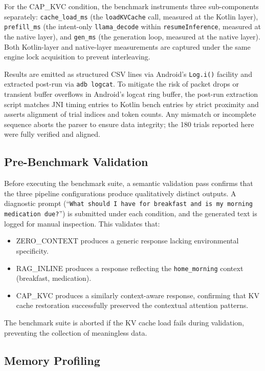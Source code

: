 \documentclass[journal]{IEEEtran}
\begin{document}
For the CAP\_KVC condition, the benchmark instruments three sub-components separately: \texttt{cache\_load\_ms} (the \texttt{loadKVCache} call, measured at the Kotlin layer), \texttt{prefill\_ms} (the intent-only \texttt{llama\_decode} within \texttt{resumeInference}, measured at the native layer), and \texttt{gen\_ms} (the generation loop, measured at the native layer). Both Kotlin-layer and native-layer measurements are captured under the same engine lock acquisition to prevent interleaving.

Results are emitted as structured CSV lines via Android's \texttt{Log.i()} facility and extracted post-run via \texttt{adb logcat}. To mitigate the risk of packet drops or transient buffer overflows in Android's logcat ring buffer, the post-run extraction script matches JNI timing entries to Kotlin bench entries by strict proximity and asserts alignment of trial indices and token counts. Any mismatch or incomplete sequence aborts the parser to ensure data integrity; the 180 trials reported here were fully verified and aligned.

\subsection{Pre-Benchmark Validation}
\label{sec:validation}

Before executing the benchmark suite, a semantic validation pass confirms that the three pipeline configurations produce qualitatively distinct outputs. A diagnostic prompt (``\texttt{What should I have for breakfast and is my morning medication due?}'') is submitted under each condition, and the generated text is logged for manual inspection. This validates that:

\begin{itemize}
    \item ZERO\_CONTEXT produces a generic response lacking environmental specificity.
    \item RAG\_INLINE produces a response reflecting the \texttt{home\_morning} context (breakfast, medication).
    \item CAP\_KVC produces a similarly context-aware response, confirming that KV cache restoration successfully preserved the contextual attention patterns.
\end{itemize}

The benchmark suite is aborted if the KV cache load fails during validation, preventing the collection of meaningless data.

\subsection{Memory Profiling}
\label{sec:memory_profiling}
\end{document}
